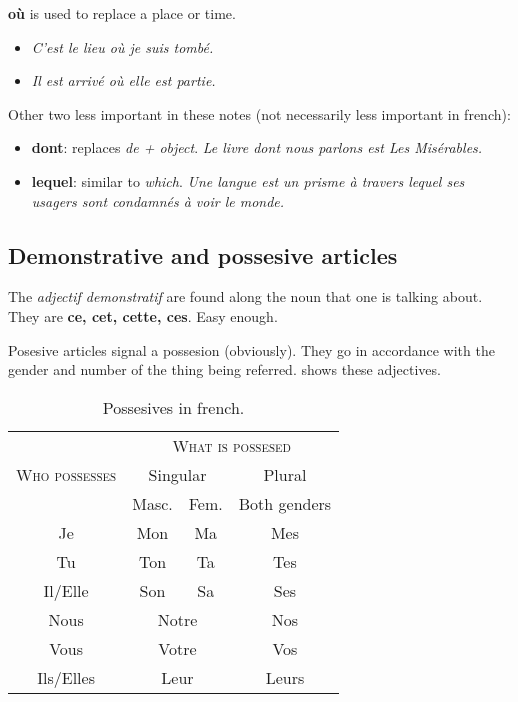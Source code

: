 \documentclass[palatino]{nicenotes}
\begin{document}
\textbf{où} is used to replace a place or time.

\begin{itemize}
\item \textit{C'est le lieu où je suis tombé.}
\item \textit{Il est arrivé où elle est partie.}
\end{itemize}

Other two less important in these notes (not necessarily less important in french):

\begin{itemize}
\item \textbf{dont}: replaces \textit{de + object}. \textit{Le livre dont nous parlons est Les Misérables.}
\item \textbf{lequel}: similar to \textit{which}. \textit{Une langue est un prisme à travers lequel ses usagers sont condamnés à voir le monde.}
\end{itemize}

\subsection{Demonstrative and possesive articles}

The \textit{adjectif demonstratif} are found along the noun that one is talking about. They are \textbf{ce, cet, cette, ces}. Easy enough.

Posesive articles signal a possesion (obviously). They go in accordance with the gender and number of the thing being referred.  shows these adjectives.

\begin{table}[hbtp]
\centering
\begin{tabular}{c|cc|c}
 & \multicolumn{3}{c}{\textsc{What is possesed}} \\
\textsc{Who possesses}	& \multicolumn{2}{c}{Singular} & Plural \\
	& Masc. & Fem. & Both genders \\ \midrule
Je & Mon & Ma & Mes \\
Tu & Ton & Ta & Tes \\
Il/Elle & Son & Sa & Ses \\
Nous & \multicolumn{2}{c|}{Notre} & Nos \\
Vous & \multicolumn{2}{c|}{Votre} & Vos \\
Ils/Elles & \multicolumn{2}{c|}{Leur} & Leurs \\
\end{tabular}
\caption{Possesives in french.}
\label{tab:Possesives}
\end{table}
\end{document}
